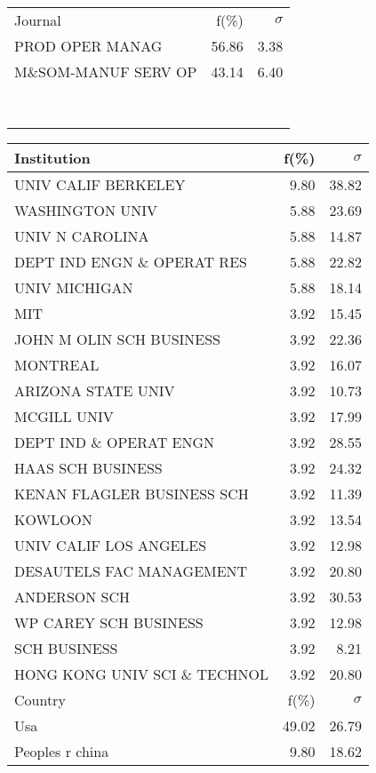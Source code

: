 \documentclass[a4paper,11pt]{report}
\begin{document}
\begin{landscape}
\begin{table}[!ht]
{\begin{tabular}{|l r  r|}
 &  & \\
\hline
\hline
Journal & f(\%) & $\sigma$\\
\hline
PROD OPER MANAG & 56.86 & 3.38\\
M\&SOM-MANUF SERV OP & 43.14 & 6.40\\
 &  & \\
 &  & \\
 &  & \\
 &  & \\
 &  & \\
 &  & \\
 &  & \\
 &  & \\
\hline
\end{tabular}
}
{\scriptsize\begin{tabular}{|l r r|}
\hline
Institution & f(\%) & $\sigma$\\
\hline
UNIV CALIF BERKELEY & 9.80 & 38.82\\
WASHINGTON UNIV & 5.88 & 23.69\\
UNIV N CAROLINA & 5.88 & 14.87\\
DEPT IND ENGN \& OPERAT RES & 5.88 & 22.82\\
UNIV MICHIGAN & 5.88 & 18.14\\
MIT & 3.92 & 15.45\\
JOHN M OLIN SCH BUSINESS & 3.92 & 22.36\\
MONTREAL & 3.92 & 16.07\\
ARIZONA STATE UNIV & 3.92 & 10.73\\
MCGILL UNIV & 3.92 & 17.99\\
DEPT IND \& OPERAT ENGN & 3.92 & 28.55\\
HAAS SCH BUSINESS & 3.92 & 24.32\\
KENAN FLAGLER BUSINESS SCH & 3.92 & 11.39\\
KOWLOON & 3.92 & 13.54\\
UNIV CALIF LOS ANGELES & 3.92 & 12.98\\
DESAUTELS FAC MANAGEMENT & 3.92 & 20.80\\
ANDERSON SCH & 3.92 & 30.53\\
WP CAREY SCH BUSINESS & 3.92 & 12.98\\
SCH BUSINESS & 3.92 & 8.21\\
HONG KONG UNIV SCI \& TECHNOL & 3.92 & 20.80\\
\hline
\hline
Country & f(\%) & $\sigma$\\
\hline
Usa & 49.02 & 26.79\\
Peoples r china & 9.80 & 18.62\\

\end{tabular}}
\end{table}
\end{landscape}
\end{document}
